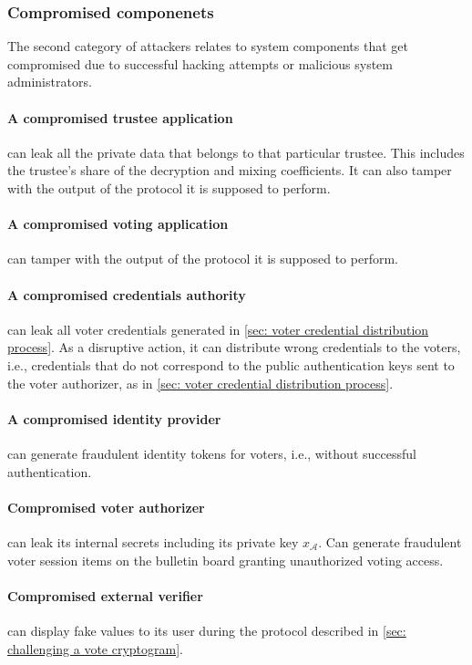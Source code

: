 \subsubsection{Compromised componenets} \label{sec: compromised components}
The second category of attackers relates to system components that get compromised due to successful hacking attempts or malicious system administrators.

\paragraph{A compromised trustee application} can leak all the private data that belongs to that particular trustee. This includes the trustee's share of the decryption and mixing coefficients. It can also tamper with the output of the protocol it is supposed to perform.

\paragraph{A compromised voting application} can tamper with the output of the protocol it is supposed to perform.

\paragraph{A compromised credentials authority} can leak all voter credentials generated in \cref{sec: voter credential distribution process}. As a disruptive action, it can distribute wrong credentials to the voters, i.e., credentials that do not correspond to the public authentication keys sent to the voter authorizer, as in \cref{sec: voter credential distribution process}.

\paragraph{A compromised identity provider} can generate fraudulent identity tokens for voters, i.e., without successful authentication.

\paragraph{Compromised voter authorizer} can leak its internal secrets including its private key $x_\mathcal{A}$. Can generate fraudulent voter session items on the bulletin board granting unauthorized voting access.

\paragraph{Compromised external verifier} can display fake values to its user during the protocol described in \cref{sec: challenging a vote cryptogram}. 


